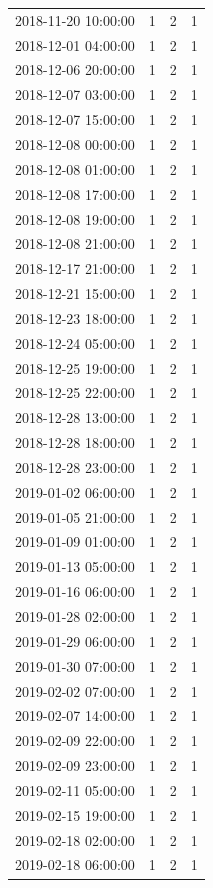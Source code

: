 \begin{tabular}{lrrr}
2018-11-20 10:00:00 & 1 & 2 & 1 \\
2018-12-01 04:00:00 & 1 & 2 & 1 \\
2018-12-06 20:00:00 & 1 & 2 & 1 \\
2018-12-07 03:00:00 & 1 & 2 & 1 \\
2018-12-07 15:00:00 & 1 & 2 & 1 \\
2018-12-08 00:00:00 & 1 & 2 & 1 \\
2018-12-08 01:00:00 & 1 & 2 & 1 \\
2018-12-08 17:00:00 & 1 & 2 & 1 \\
2018-12-08 19:00:00 & 1 & 2 & 1 \\
2018-12-08 21:00:00 & 1 & 2 & 1 \\
2018-12-17 21:00:00 & 1 & 2 & 1 \\
2018-12-21 15:00:00 & 1 & 2 & 1 \\
2018-12-23 18:00:00 & 1 & 2 & 1 \\
2018-12-24 05:00:00 & 1 & 2 & 1 \\
2018-12-25 19:00:00 & 1 & 2 & 1 \\
2018-12-25 22:00:00 & 1 & 2 & 1 \\
2018-12-28 13:00:00 & 1 & 2 & 1 \\
2018-12-28 18:00:00 & 1 & 2 & 1 \\
2018-12-28 23:00:00 & 1 & 2 & 1 \\
2019-01-02 06:00:00 & 1 & 2 & 1 \\
2019-01-05 21:00:00 & 1 & 2 & 1 \\
2019-01-09 01:00:00 & 1 & 2 & 1 \\
2019-01-13 05:00:00 & 1 & 2 & 1 \\
2019-01-16 06:00:00 & 1 & 2 & 1 \\
2019-01-28 02:00:00 & 1 & 2 & 1 \\
2019-01-29 06:00:00 & 1 & 2 & 1 \\
2019-01-30 07:00:00 & 1 & 2 & 1 \\
2019-02-02 07:00:00 & 1 & 2 & 1 \\
2019-02-07 14:00:00 & 1 & 2 & 1 \\
2019-02-09 22:00:00 & 1 & 2 & 1 \\
2019-02-09 23:00:00 & 1 & 2 & 1 \\
2019-02-11 05:00:00 & 1 & 2 & 1 \\
2019-02-15 19:00:00 & 1 & 2 & 1 \\
2019-02-18 02:00:00 & 1 & 2 & 1 \\
2019-02-18 06:00:00 & 1 & 2 & 1 \\

\end{tabular}
